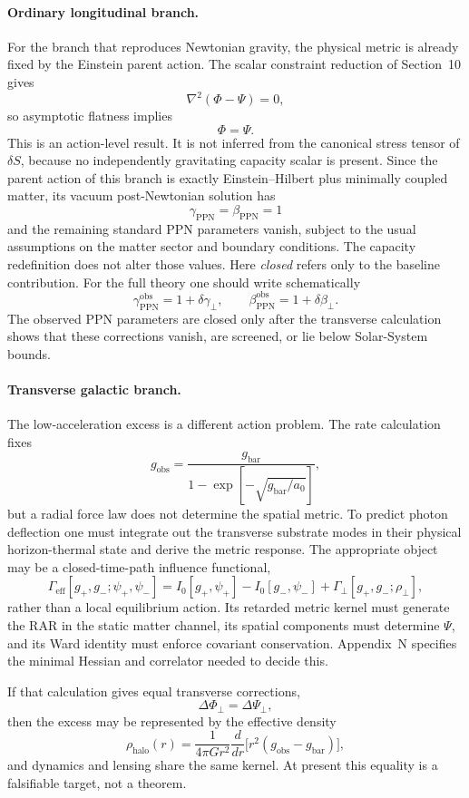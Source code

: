 \documentclass[11pt]{article}
\begin{document}
\paragraph{Ordinary longitudinal branch.}
For the branch that reproduces Newtonian gravity, the physical metric is already fixed by the Einstein parent action. The scalar constraint reduction of Section~10 gives
\[
\nabla^2(\Phi-\Psi)=0,
\]
so asymptotic flatness implies
\[
\Phi=\Psi.
\]
This is an action-level result. It is not inferred from the canonical stress tensor of $\delta S$, because no independently gravitating capacity scalar is present. Since the parent action of this branch is exactly Einstein--Hilbert plus minimally coupled matter, its vacuum post-Newtonian solution has
\[
\gamma_{\mathrm{PPN}}=\beta_{\mathrm{PPN}}=1
\]
and the remaining standard PPN parameters vanish, subject to the usual assumptions on the matter sector and boundary conditions. The capacity redefinition does not alter those values. Here \emph{closed} refers only to the baseline contribution. For the full theory one should write schematically
\[
\gamma_{\mathrm{PPN}}^{\mathrm{obs}}
=1+\delta\gamma_\perp,
\qquad
\beta_{\mathrm{PPN}}^{\mathrm{obs}}
=1+\delta\beta_\perp.
\]
The observed PPN parameters are closed only after the transverse calculation shows that these corrections vanish, are screened, or lie below Solar-System bounds.

\paragraph{Transverse galactic branch.}
The low-acceleration excess is a different action problem. The rate calculation fixes
\[
g_{\mathrm{obs}}
=\frac{g_{\mathrm{bar}}}
{1-\exp[-\sqrt{g_{\mathrm{bar}}/a_0}]},
\]
but a radial force law does not determine the spatial metric. To predict photon deflection one must integrate out the transverse substrate modes in their physical horizon-thermal state and derive the metric response. The appropriate object may be a closed-time-path influence functional,
\[
\Gamma_{\mathrm{eff}}[g_+,g_-;\psi_+,\psi_-]
=I_0[g_+,\psi_+]-I_0[g_-,\psi_-]
+\Gamma_\perp[g_+,g_-;\rho_\perp],
\]
rather than a local equilibrium action. Its retarded metric kernel must generate the RAR in the static matter channel, its spatial components must determine $\Psi$, and its Ward identity must enforce covariant conservation. Appendix~N specifies the minimal Hessian and correlator needed to decide this.

If that calculation gives equal transverse corrections,
\[
\Delta\Phi_\perp=\Delta\Psi_\perp,
\]
then the excess may be represented by the effective density
\[
\rho_{\mathrm{halo}}(r)
=\frac{1}{4\pi Gr^2}\frac{d}{dr}
\Big[r^2(g_{\mathrm{obs}}-g_{\mathrm{bar}})\Big],
\]
and dynamics and lensing share the same kernel. At present this equality is a falsifiable target, not a theorem.
\end{document}
